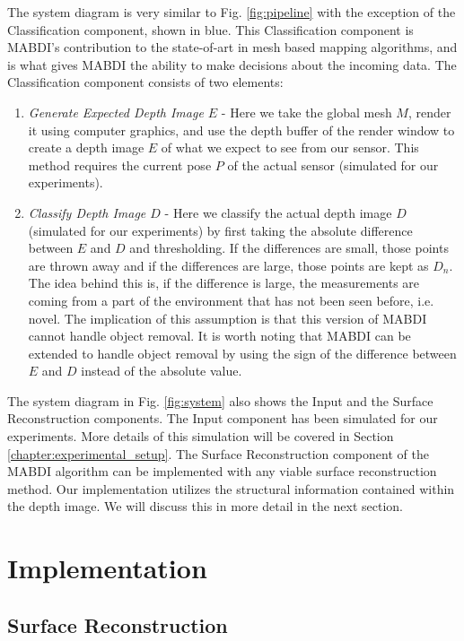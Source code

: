 The system diagram is very similar to Fig. \ref{fig:pipeline} with the exception
of the Classification component, shown in blue. This Classification component is
MABDI's contribution to the state-of-art in mesh based mapping algorithms, and
is what gives MABDI the ability to make decisions about the incoming data. The
Classification component consists of two elements:
\begin{enumerate}
    \item \textit{Generate Expected Depth Image $E$} - Here we take the global
    mesh $M$, render it using computer graphics, and use the depth buffer of the
    render window to create a depth image $E$ of what we expect to see from our
    sensor. This method requires the current pose $P$ of the actual sensor
    (simulated for our experiments).
    \item \textit{Classify Depth Image $D$} - Here we classify the actual depth
    image $D$ (simulated for our experiments) by first taking the absolute
    difference between $E$ and $D$ and thresholding. If the differences are
    small, those points are thrown away and if the differences are large, those
    points are kept as $D_n$. The idea behind this is, if the difference is
    large, the measurements are coming from a part of the environment that has
    not been seen before, i.e. novel. The implication of this assumption is that
    this version of MABDI cannot handle object removal. It is worth noting
    that MABDI can be extended to handle object removal by using the sign of the
    difference between $E$ and $D$ instead of the absolute value.
\end{enumerate}

The system diagram in Fig. \ref{fig:system} also shows the Input and the Surface
Reconstruction components. The Input component has been simulated for our
experiments. More details of this simulation will be covered in Section
\ref{chapter:experimental_setup}. The Surface Reconstruction component of the
MABDI algorithm can be implemented with any viable surface reconstruction
method. Our implementation utilizes the structural information contained within
the depth image. We will discuss this in more detail in the next section.

\section{Implementation}

\subsection{Surface Reconstruction}

